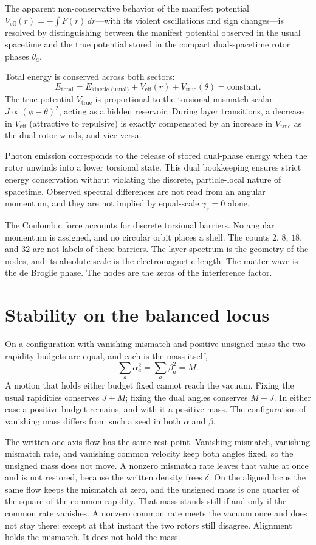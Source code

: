 \documentclass[a4paper]{article}
\begin{document}
The apparent non-conservative behavior of the manifest potential \(V_\text{eff}(r) = -\int F(r)\, dr\)—with its violent oscillations and sign changes—is resolved by distinguishing between the manifest potential observed in the usual spacetime and the true potential stored in the compact dual-spacetime rotor phases \(\theta_a\).

Total energy is conserved across both sectors:
\[
E_\text{total} = E_\text{kinetic (usual)} + V_\text{eff}(r) + V_\text{true}(\theta) = \text{constant}.
\]
The true potential \(V_\text{true}\) is proportional to the torsional mismatch scalar \(J \propto (\phi - \theta)^2\), acting as a hidden reservoir. During layer transitions, a decrease in \(V_\text{eff}\) (attractive to repulsive) is exactly compensated by an increase in \(V_\text{true}\) as the dual rotor winds, and vice versa.

Photon emission corresponds to the release of stored dual-phase energy when the rotor unwinds into a lower torsional state. This dual bookkeeping ensures strict energy conservation without violating the discrete, particle-local nature of spacetime. Observed spectral differences are not read from an angular momentum, and they are not implied by equal-scale \(\gamma_s=0\) alone.

The Coulombic force accounts for discrete torsional barriers. No angular momentum is assigned, and no circular orbit places a shell. The counts \(2\), \(8\), \(18\), and \(32\) are not labels of these barriers. The layer spectrum is the geometry of the nodes, and its absolute scale is the electromagnetic length. The matter wave is the de Broglie phase. The nodes are the zeros of the interference factor.

\section{Stability on the balanced locus}
\label{sec:particle-stability}

On a configuration with vanishing mismatch and positive unsigned mass the two rapidity budgets are equal, and each is the mass itself,
\[
\sum_a\alpha_a^2=\sum_a\beta_a^2=M.
\]
A motion that holds either budget fixed cannot reach the vacuum. Fixing the usual rapidities conserves \(J+M\); fixing the dual angles conserves \(M-J\). In either case a positive budget remains, and with it a positive mass. The configuration of vanishing mass differs from such a seed in both \(\alpha\) and \(\beta\).

The written one-axis flow has the same rest point. Vanishing mismatch, vanishing mismatch rate, and vanishing common velocity keep both angles fixed, so the unsigned mass does not move. A nonzero mismatch rate leaves that value at once and is not restored, because the written density frees \(\delta\). On the aligned locus the same flow keeps the mismatch at zero, and the unsigned mass is one quarter of the square of the common rapidity. That mass stands still if and only if the common rate vanishes. A nonzero common rate meets the vacuum once and does not stay there: except at that instant the two rotors still disagree. Alignment holds the mismatch. It does not hold the mass.
\end{document}
